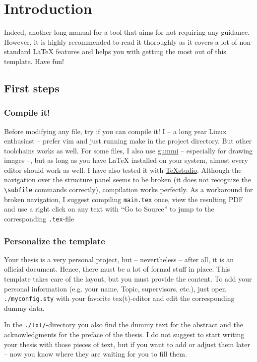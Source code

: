 \documentclass[../main.tex]{subfiles}
\begin{document}
\chapter{Introduction}

Indeed, another long manual for a tool \cite{Bithappens16Template} that aims for not requiring any guidance.
However, it is highly recommended to read it thoroughly as it covers a lot of non-standard LaTeX features and helps you with getting the most out of this template.
Have fun!

\section{First steps}

\subsection{Compile it!}

Before modifying any file, try if you can compile it!
I -- a long year Linux enthusiast -- prefer vim and just running make in the project directory.
But other toolchains works as well.
For some files, I also use \href{https://github.com/alexandervdm/gummi}{gummi} -- especially for drawing images --, but as long as you have LaTeX installed on your system, almost every editor should work as well.
I have also tested it with \href{http://www.texstudio.org/}{TeXstudio}.
Although the navigation over the structure panel seems to be broken (it does not recognize the \texttt{\textbackslash subfile} commands correctly), compilation works perfectly.
As a workaround for broken navigation, I suggest compiling \texttt{main.tex} once, view the resulting PDF and use a right click on any text with \enquote{Go to Source} to jump to the corresponding \texttt{.tex}-file


\subsection{Personalize the template}

Your thesis is a very personal project, but -- nevertheless -- after all, it is an official document.
Hence, there must be a lot of formal stuff in place.
This template takes care of the layout, but you must provide the content.
To add your personal information (e.g. your name, Topic, supervisors, etc.), just open \texttt{./myconfig.sty} with your favorite tex(t)-editor and edit the corresponding dummy data.

In the \texttt{./txt/}-directory you also find the dummy text for the abstract and the acknowledgments for the preface of the thesis.
I do not suggest to start writing your thesis with those pieces of text, but if you want to add or adjust them later -- now you know where they are waiting for you to fill them.
\end{document}
